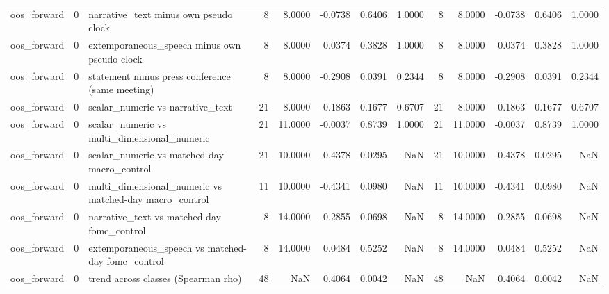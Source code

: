 \begin{tabular}{lrlrrrrrrrrrr}
oos_forward & 0 & narrative_text minus own pseudo clock & 8 & 8.0000 & -0.0738 & 0.6406 & 1.0000 & 8 & 8.0000 & -0.0738 & 0.6406 & 1.0000 \\
oos_forward & 0 & extemporaneous_speech minus own pseudo clock & 8 & 8.0000 & 0.0374 & 0.3828 & 1.0000 & 8 & 8.0000 & 0.0374 & 0.3828 & 1.0000 \\
oos_forward & 0 & statement minus press conference (same meeting) & 8 & 8.0000 & -0.2908 & 0.0391 & 0.2344 & 8 & 8.0000 & -0.2908 & 0.0391 & 0.2344 \\
oos_forward & 0 & scalar_numeric vs narrative_text & 21 & 8.0000 & -0.1863 & 0.1677 & 0.6707 & 21 & 8.0000 & -0.1863 & 0.1677 & 0.6707 \\
oos_forward & 0 & scalar_numeric vs multi_dimensional_numeric & 21 & 11.0000 & -0.0037 & 0.8739 & 1.0000 & 21 & 11.0000 & -0.0037 & 0.8739 & 1.0000 \\
oos_forward & 0 & scalar_numeric vs matched-day macro_control & 21 & 10.0000 & -0.4378 & 0.0295 & NaN & 21 & 10.0000 & -0.4378 & 0.0295 & NaN \\
oos_forward & 0 & multi_dimensional_numeric vs matched-day macro_control & 11 & 10.0000 & -0.4341 & 0.0980 & NaN & 11 & 10.0000 & -0.4341 & 0.0980 & NaN \\
oos_forward & 0 & narrative_text vs matched-day fomc_control & 8 & 14.0000 & -0.2855 & 0.0698 & NaN & 8 & 14.0000 & -0.2855 & 0.0698 & NaN \\
oos_forward & 0 & extemporaneous_speech vs matched-day fomc_control & 8 & 14.0000 & 0.0484 & 0.5252 & NaN & 8 & 14.0000 & 0.0484 & 0.5252 & NaN \\
oos_forward & 0 & trend across classes (Spearman rho) & 48 & NaN & 0.4064 & 0.0042 & NaN & 48 & NaN & 0.4064 & 0.0042 & NaN \\
\bottomrule
\end{tabular}
